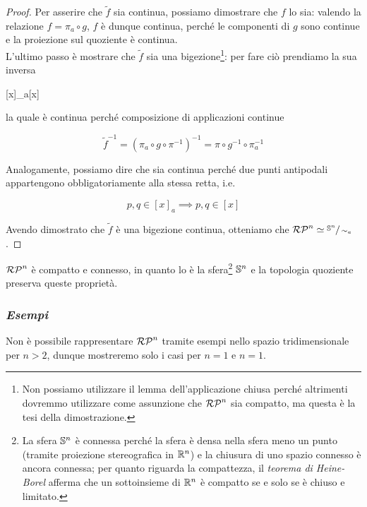 \begin{proof}
	Per asserire che $ \tilde{f} $ sia continua, possiamo dimostrare che $ f $ lo sia: valendo la relazione $ f = \pi_{a} \circ g $, $ f $ è dunque continua, perché le componenti di $ g $ sono continue e la proiezione sul quoziente è continua.\\
	L'ultimo passo è mostrare che $ \tilde{f} $ sia una bigezione\footnote{%
		Non possiamo utilizzare il lemma dell'applicazione chiusa perché altrimenti dovremmo utilizzare come assunzione che $ \rp{n} $ sia compatto, ma questa è la tesi della dimostrazione.%
	}: per fare ciò prendiamo la sua inversa

		{}{}
		{[x]_{a}}{[x]}

	la quale è continua perché composizione di applicazioni continue
	
	\begin{equation}
		\tilde{f}^{-1} = (\pi_{a} \circ g \circ \pi^{-1})^{-1} = \pi \circ g^{-1} \circ \pi_{a}^{-1}
	\end{equation}

	Analogamente, possiamo dire che sia continua perché due punti antipodali appartengono obbligatoriamente alla stessa retta, i.e.
	
	\begin{equation}
		p,q \in [x]_{a} \implies p,q \in [x]
	\end{equation}

	Avendo dimostrato che $ \tilde{f} $ è una bigezione continua, otteniamo che $ \rp{n} \simeq \sfrac{\S^{n}}{\sim_{a}} $.
\end{proof}

\begin{corollary}
	$ \rp{n} $ è compatto e connesso, in quanto lo è la sfera\footnote{%
		La sfera $ \S^{n} $ è connessa perché la sfera è densa nella sfera meno un punto (tramite proiezione stereografica in $ \R^{n} $) e la chiusura di uno spazio connesso è ancora connessa; per quanto riguarda la compattezza, il \textit{teorema di Heine-Borel} afferma che un sottoinsieme di $ \R^{n} $ è compatto se e solo se è chiuso e limitato.%
	} $ \S^{n} $ e la topologia quoziente preserva queste proprietà.
\end{corollary}

\subsubsection{\textit{Esempi}}

Non è possibile rappresentare $ \rp{n} $ tramite esempi nello spazio tridimensionale per $ n > 2 $, dunque mostreremo solo i casi per $ n = 1 $ e  $ n = 1 $.

